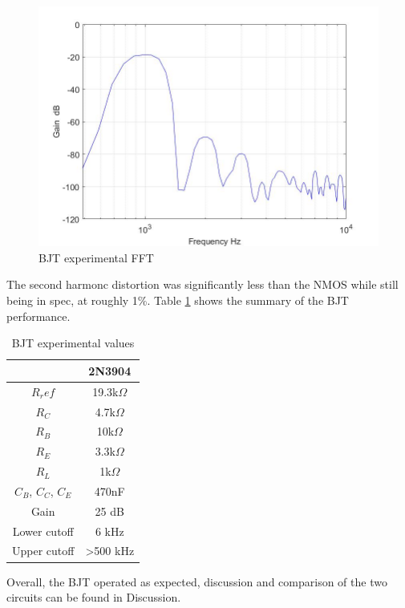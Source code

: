 \begin{figure}[H]
	\centering
	\includegraphics[width=0.7\linewidth]{ExperimentalImplementation/bjt_fft.jpg}
	\caption{BJT experimental FFT}
	\label{fig:bjtexpfft}
\end{figure}

The second harmonc distortion was significantly less than the NMOS while still being in spec, at roughly 1\%. Table \ref{tab:bjtexp} shows the summary of the BJT performance.




\begin{table}[H]
	\centering
	\caption{BJT experimental values}
	\label{tab:bjtexp}
	\begin{tabular}{|c|c|}
	\begin{tabular}{|c|c|} \hline
		$Q_1, Q_2, Q_3$ & 2N3904        \\ \hline
		$R_ref$         & 19.3k$\Omega$ \\ \hline
		$R_C$           & 4.7k$\Omega$  \\ \hline
		$R_B$           & 10k$\Omega$   \\ \hline 
		$R_E$           & 3.3k$\Omega$  \\ \hline 
		$R_L$           & 1k$\Omega$    \\ \hline
		$C_B$, $C_C$, $C_E$ & 470nF     \\ \hline
		Gain           & 25 dB          \\ \hline
		Lower cutoff   & 6 kHz          \\ \hline
		Upper cutoff   &  >500 kHz      \\ \hline
	\end{tabular}
\end{table}

Overall, the BJT operated as expected, discussion and comparison of the two circuits can be found in Discussion.


%



